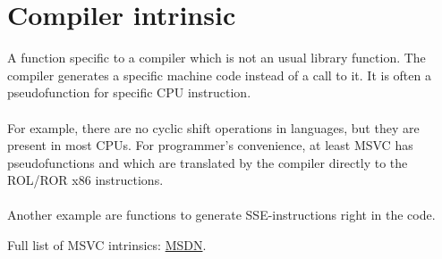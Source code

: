 \section{Compiler intrinsic}
\label{sec:compiler_intrinsic}


A function specific to a compiler which is not an usual library function.
The compiler generates a specific machine code instead of a call to it.
It is often a pseudofunction for specific \ac{CPU} instruction. \\
\\
For example, there are no cyclic shift operations in \CCpp languages, but they are present in most \ac{CPU}s.
For programmer's convenience, at least MSVC has pseudofunctions
 and \FNMSDNROTxURL{}
which are translated by the compiler directly to the ROL/ROR x86 instructions. \\
\\
Another example are functions to generate SSE-instructions right in the code.

Full list of MSVC intrinsics: \href{http://go.yurichev.com/17254}{MSDN}.

